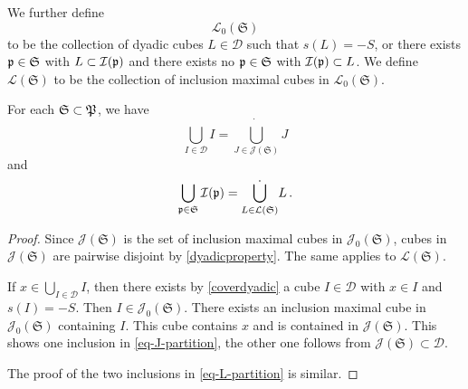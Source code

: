 We further define
$$
    \mathcal{L}_0(\mathfrak{S})
$$
to be the collection of dyadic cubes $L \in \mathcal{D}$ such that $s(L) = -S$, or there exists ${\mathfrak p} \in \mathfrak{S}$ with $L \subset {\mathcal{I}}({\mathfrak p})$ and there exists no ${\mathfrak p} \in \mathfrak{S}$ with ${\mathcal{I}}({\mathfrak p}) \subset L$. We define $\mathcal{L}(\mathfrak{S})$ to be the collection of inclusion maximal cubes in $\mathcal{L}_0(\mathfrak{S})$.

\begin{lemma}
    \label{dyadic-partitions}
    \leanok
    For each $\mathfrak{S} \subset {\mathfrak P}$, we have
    \begin{equation}
        \label{eq-J-partition}
        \bigcup_{I \in \mathcal{D}} I = \dot{\bigcup_{J \in \mathcal{J}(\mathfrak{S})}} J
    \end{equation}
    and
    \begin{equation}
        \label{eq-L-partition}
        \bigcup_{{\mathfrak p}\in \mathfrak{S}} {\mathcal{I}}({\mathfrak p}) = \dot{\bigcup_{L \in \mathcal{L}(\mathfrak{S})}} L\,.
    \end{equation}
\end{lemma}

\begin{proof}
    \leanok
    Since $\mathcal{J}(\mathfrak{S})$ is the set of inclusion maximal cubes in $\mathcal{J}_0(\mathfrak{S})$, cubes in $\mathcal{J}(\mathfrak{S})$ are pairwise disjoint by \eqref{dyadicproperty}. The same applies to $\mathcal{L}(\mathfrak{S})$.

    If $x \in \bigcup_{I \in \mathcal{D}} I$, then there exists by \eqref{coverdyadic} a cube $I \in \mathcal{D}$ with $x \in I$ and $s(I) = -S$. Then $I \in \mathcal{J}_0(\mathfrak{S})$. There exists an inclusion maximal cube in $\mathcal{J}_0(\mathfrak{S})$ containing $I$. This cube contains $x$ and is contained in $\mathcal{J}(\mathfrak{S})$. This shows one inclusion in \eqref{eq-J-partition}, the other one follows from $\mathcal{J}(\mathfrak{S}) \subset \mathcal{D}$.

    The proof of the two inclusions in \eqref{eq-L-partition} is similar.
\end{proof}

